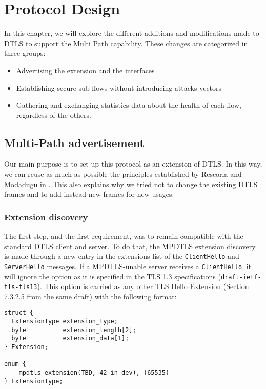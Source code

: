 \chapter{Protocol Design}\label{chap:design}

In this chapter, we will explore the different additions and modifications made to DTLS to support the Multi Path capability. These changes are categorized in three groups:
\begin{itemize}
\item Advertising the extension and the interfaces
\item Establishing secure sub-flows without introducing attacks vectors
\item Gathering and exchanging statistics data about the health of each flow, regardless of the others. 
\end{itemize}


\section{Multi-Path advertisement}

Our main purpose is to set up this protocol as an extension of DTLS. In this way, we can reuse as much as possible the principles established by Rescorla and Modadugu in \cite{modadugu2004design}. This also explains why we tried not to change the existing DTLS frames and to add instead new frames for new usages.

\subsection{Extension discovery}

The first step, and the first requirement, was to remain compatible with the standard DTLS client and server. To do that, the MPDTLS extension discovery is made through a new entry in the extensions list of the \texttt{ClientHello} and \texttt{ServerHello} messages. If a MPDTLS-unable server receives a \texttt{ClientHello}, it will ignore the option as it is specified in the TLS 1.3 specifications (\texttt{draft-ietf- tls-tls13}\cite{draft-tls13}). This option is carried as any other TLS Hello Extension (Section 7.3.2.5 from the same draft) with the following format:

\begin{lstlisting}[caption=MultiPath DTLS Extension structure, label=lst:extension]
struct {
  ExtensionType extension_type;
  byte          extension_length[2];
  byte          extension_data[1];
} Extension;

enum {
    mpdtls_extension(TBD, 42 in dev), (65535)
} ExtensionType;
\end{lstlisting}

